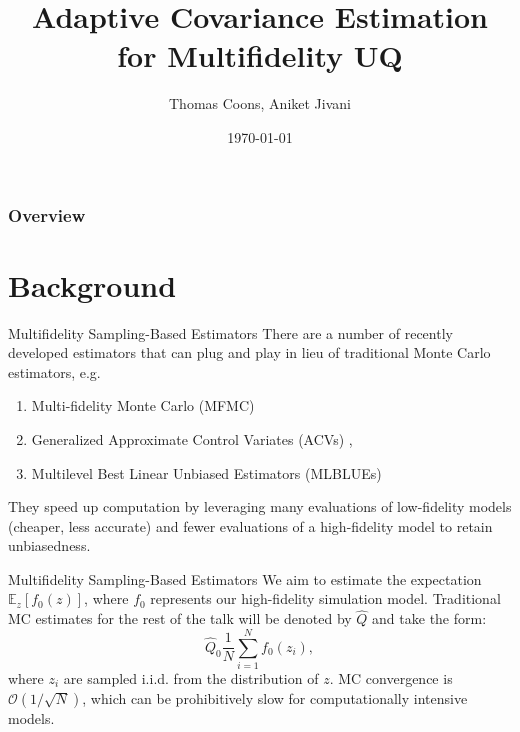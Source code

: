 \documentclass[usenames,dvipsnames]{beamer}
\title[Seminar]{Adaptive Covariance Estimation for Multifidelity UQ}
\author[TC, AJ]{Thomas Coons, Aniket Jivani}
\institute[U-M]{Department of Mechanical Engineering, \\ University of Michigan}
\date{\today}
\theoremstyle{definition}
\let\oldcite=\cite
\renewcommand{\cite}[2][]{\textcolor{green}{\oldcite[#1]{#2}}}
\begin{document}
\begin{frame}
\titlepage %
\end{frame}



\begin{frame}
 \frametitle{Overview} %
 \tableofcontents %
\end{frame}

\section{Background}

\begin{frame}{Multifidelity Sampling-Based Estimators}
    There are a number of recently developed estimators that can plug and play in lieu of traditional Monte Carlo estimators, e.g.
    \begin{enumerate}
        \item Multi-fidelity Monte Carlo (MFMC) \cite{peherstorfer_optimal_2016}
        \item Generalized Approximate Control Variates (ACVs) \cite{bomarito_optimization_2022}, \cite{gorodetsky_generalized_2020}
        \item Multilevel Best Linear Unbiased Estimators (MLBLUEs) \cite{schaden_multilevel_2020}
    \end{enumerate}
    \vspace{3mm} They speed up computation by leveraging many evaluations of low-fidelity models (cheaper, less accurate) and fewer evaluations of a high-fidelity model to retain unbiasedness.
\end{frame}

\begin{frame}{Multifidelity Sampling-Based Estimators}
    We aim to estimate the expectation $\mathbb{E}_{z}[f_{0}(z)]$, where $f_{0}$ represents our high-fidelity simulation model. Traditional MC estimates for the rest of the talk will be denoted by $\hat{Q}$ and take the form:
    \begin{equation}
        \hat{Q}_{0} \frac{1}{N} \sum_{i=1}^{N} f_{0}(z_{i}),
    \end{equation}
    where $z_{i}$ are sampled i.i.d. from the distribution of $z$. MC convergence is $\mathcal{O}(1/\sqrt{N})$, which can be prohibitively slow for computationally intensive models.
\end{frame}
\end{document}
